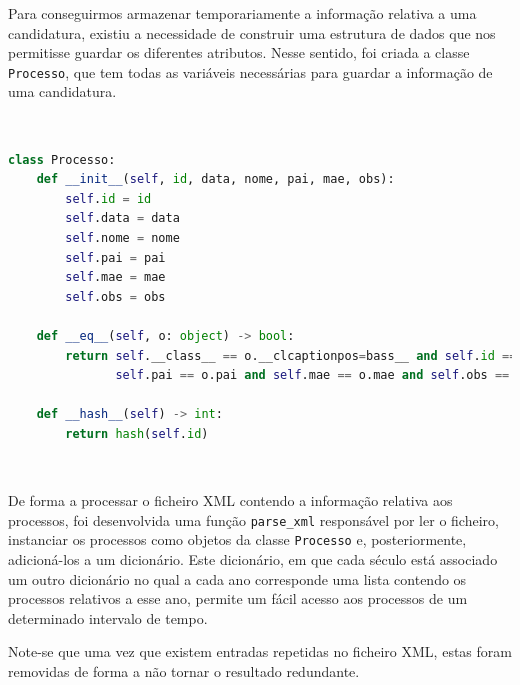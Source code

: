 \documentclass[a4paper, 11pt]{article}
\begin{document}
Para conseguirmos armazenar temporariamente a informação relativa a uma candidatura, existiu a
necessidade de construir uma estrutura de dados que nos permitisse guardar os diferentes atributos.
Nesse sentido, foi criada a classe \texttt{Processo}, que tem todas as variáveis necessárias para guardar
a informação de uma candidatura.

\

\begin{lstlisting}[language=Python]
class Processo:
    def __init__(self, id, data, nome, pai, mae, obs):
        self.id = id
        self.data = data
        self.nome = nome
        self.pai = pai
        self.mae = mae
        self.obs = obs
        
    def __eq__(self, o: object) -> bool:
        return self.__class__ == o.__clcaptionpos=bass__ and self.id == o.id and self.data == o.data and self.nome == o.nome and \
               self.pai == o.pai and self.mae == o.mae and self.obs == o.obs

    def __hash__(self) -> int:
        return hash(self.id)
\end{lstlisting}

\

De forma a processar o ficheiro XML contendo a informação relativa aos processos, foi desenvolvida
uma função \texttt{parse\_xml} responsável por ler o ficheiro, instanciar os processos como objetos
da classe \texttt{Processo} e, posteriormente, adicioná-los a um dicionário. Este dicionário, em que
cada século está associado um outro dicionário no qual a cada ano corresponde uma lista contendo os
processos relativos a esse ano, permite um fácil acesso aos processos de um determinado intervalo de
tempo.

Note-se que uma vez que existem entradas repetidas no ficheiro XML, estas foram removidas de forma a
não tornar o resultado redundante.

\
\end{document}
